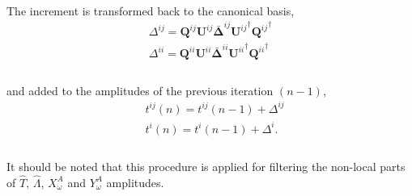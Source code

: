 \\
The increment is transformed back to the canonical basis,
\\
\begin{equation}
\begin{split}
{\Delta}^{ij} = \bm{Q}^{ij}\bm{U}^{ij} {\bm{\bar{\Delta}}}^{ij} {\bm{U}^{ij}}^{\dagger} {\bm{Q}^{ij}}^{\dagger}\\
{\Delta}^{ii} = \bm{Q}^{ii}\bm{U}^{ii} {\bm{\bar{\Delta}}}^{ii} {\bm{U}^{ii}}^{\dagger} {\bm{Q}^{ii}}^{\dagger}\\
\end{split}
\end{equation}
\\
and added to the amplitudes of the previous iteration $(n-1)$,
\\
\begin{equation}
\begin{split}
&t^{ij}(n) = t^{ij}(n-1) + \Delta^{ij}\\
&t^{i}(n) = t^{i}(n-1) + \Delta^{i}.\\
\end{split}
\end{equation}
\\
It should be noted that this procedure is applied for filtering the non-local parts of $\hat{T}$, $\hat{\Lambda}$, $X^{A}_{\omega}$ 
and $Y^{A}_{\omega}$ amplitudes. 
